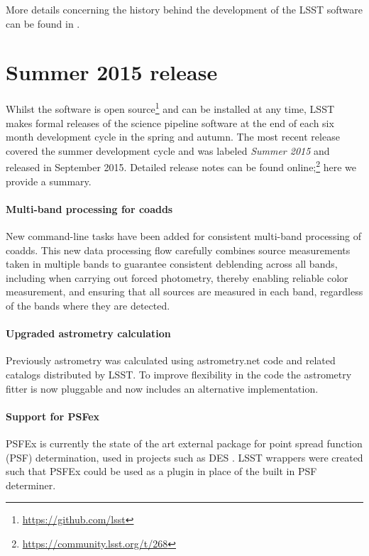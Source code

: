 \documentclass[11pt,twoside]{article}
\begin{document}
More details concerning the history behind the development of the
LSST software can be found in \citet{2010SPIE.7740E..15A}.

\section{Summer 2015 release}

Whilst the software is open
source\footnote{\url{https://github.com/lsst}} and can be installed at
any time, LSST makes formal releases of the science pipeline software
at the end of each six month development cycle in the spring and
autumn. The most recent release covered the summer development cycle
and was labeled \emph{Summer 2015} and released in September
2015. Detailed release notes can be found
online;\footnote{\url{https://community.lsst.org/t/268}} here we
provide a summary.

\paragraph{Multi-band processing for coadds} New command-line tasks
have been added for consistent multi-band processing of coadds. This
new data processing flow carefully combines source measurements taken
in multiple bands to guarantee consistent deblending across all bands,
including when carrying out forced photometry, thereby enabling
reliable color measurement, and ensuring that all sources are
measured in each band, regardless of the bands where they are detected.

\paragraph{Upgraded astrometry calculation} Previously astrometry was
calculated using astrometry.net code \citep{2010AJ....139.1782L} and
related catalogs distributed by LSST. To improve flexibility in the
code the astrometry fitter is now pluggable and now includes an
alternative implementation.

\paragraph{Support for PSFex} PSFEx is currently the state of the art
external package for point spread function (PSF) determination, used
in projects such as DES \citep{2011ASPC..442..435B}. LSST wrappers
were created such that PSFEx could be used as a plugin in place of the
built in PSF determiner.
\end{document}
